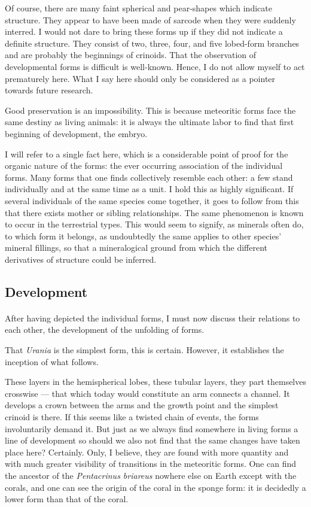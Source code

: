 \documentclass[a4paper, 12pt, oneside]{article}
\begin{document}
Of course, there are many faint spherical and pear-shapes which indicate structure. They appear to have been made of sarcode when they were suddenly interred. I would not dare to bring these forms up if they did not indicate a definite structure. They consist of two, three, four, and five lobed-form branches and are probably the beginnings of crinoids. That the observation of developmental forms is difficult is well-known. Hence, I do not allow myself to act prematurely here. What I say here should only be considered as a pointer towards future research.

Good preservation is an impossibility. This is because meteoritic forms face the same destiny as living animals: it is always the ultimate labor to find that first beginning of development, the embryo.

I will refer to a single fact here, which is a considerable point of proof for the organic nature of the forms: the ever occurring association of the individual forms. Many forms that one finds collectively resemble each other: a few stand individually and at the same time as a unit. I hold this as highly significant. If several individuals of the same species come together, it goes to follow from this that there exists mother or sibling relationships. The same phenomenon is known to occur in the terrestrial types. This would seem to signify, as minerals often do, to which form it belongs, as undoubtedly the same applies to other species' mineral fillings, so that a mineralogical ground from which the different derivatives of structure could be inferred.
\clearpage
\subsection{Development}
\paragraph*{}
After having depicted the individual forms, I must now discuss their relations to each other, the development of the unfolding of forms.

That \emph{Urania} is the simplest form, this is certain. However, it establishes the inception of what follows.

These layers in the hemispherical lobes, these tubular layers, they part themselves crosswise --- that which today would constitute an arm connects a channel. It develops a crown between the arms and the growth point and the simplest crinoid is there. If this seems like a twisted chain of events, the forms involuntarily demand it. But just as we always find somewhere in living forms a line of development so should we also not find that the same changes have taken place here? Certainly. Only, I believe, they are found with more quantity and with much greater visibility of transitions in the meteoritic forms. One can find the ancestor of the \emph{Pentacrinus briareus} nowhere else on Earth except with the corals, and one can see the origin of the coral in the sponge form: it is decidedly a lower form than that of the coral.
\end{document}
